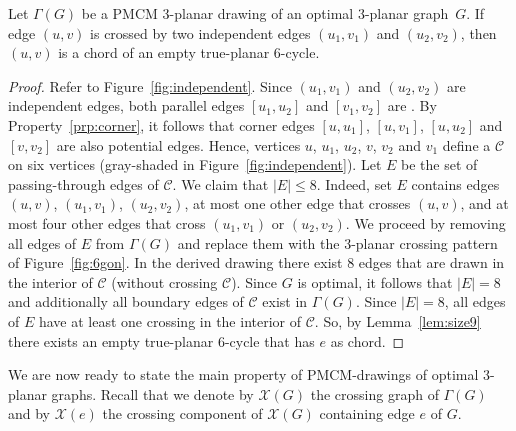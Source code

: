 \begin{lemma}\label{lem:3_planar_independent}
Let $\Gamma(G)$ be a PMCM $3$-planar drawing of an optimal $3$-planar graph~$G$. If edge $(u,v)$ is crossed by two independent edges $(u_1,v_1)$ and $(u_2,v_2)$, then $(u,v)$ is a chord of an empty true-planar $6$-cycle.
\end{lemma}
\begin{proof}
Refer to Figure~\ref{fig:independent}. Since $(u_1,v_1)$ and $(u_2,v_2)$ are independent edges, both parallel edges $[u_1,u_2]$ and $[v_1,v_2]$ are \pes. By Property~\ref{prp:corner}, it follows that corner edges $[u, u_1]$, $[u,v_1]$, $[u,u_2]$ and $[v,v_2]$ are also potential edges. Hence, vertices $u$, $u_1$, $u_2$, $v$, $v_2$ and $v_1$ define a \pp $\mathcal{C}$ on six vertices (gray-shaded in Figure~\ref{fig:independent}). Let $E$ be the set of passing-through edges of $\mathcal{C}$. We claim that $|E|\leq 8$. Indeed, set $E$ contains edges $(u,v)$, $(u_1,v_1)$, $(u_2,v_2)$, at most one other edge that crosses $(u,v)$, and at most four other edges that cross $(u_1,v_1)$ or $(u_2,v_2)$. We proceed by removing all edges of $E$ from $\Gamma(G)$ and replace them with the $3$-planar crossing pattern of Figure~\ref{fig:6gon}. In the derived drawing there exist $8$ edges that are drawn in the interior of $\mathcal{C}$ (without crossing $\mathcal{C}$). Since $G$ is optimal, it follows that $|E|=8$ and additionally all boundary edges of $\mathcal{C}$ exist in $\Gamma(G)$. Since $|E|=8$, all edges of $E$ have at least one crossing in the interior of $\mathcal{C}$. So, by Lemma~\ref{lem:size9} there exists an empty true-planar $6$-cycle that has $e$ as chord.
\end{proof}

We are now ready to state the main property of PMCM-drawings of optimal $3$-planar graphs. Recall that we denote by $\mathcal{X}(G)$ the crossing graph of $\Gamma(G)$ and by $\mathcal{X}(e)$ the crossing component of $\mathcal{X}(G)$ containing edge $e$ of $G$.


